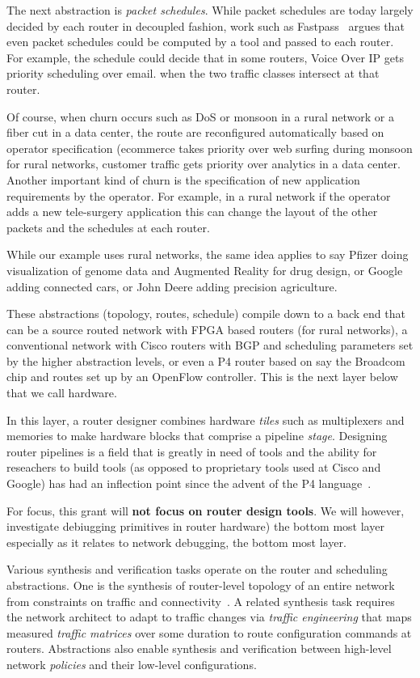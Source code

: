 The next abstraction is {\em packet schedules}.   While packet schedules are
today largely decided by each router in decoupled fashion, work such as 
Fastpass~\cite{fastpass} argues that even packet schedules could be computed by
a tool and passed to each router.  For example, the schedule could decide that
in some routers, Voice Over IP gets priority scheduling over email. when the two traffic classes intersect at that router.

Of course, when churn occurs such as DoS or monsoon in a rural network or a fiber cut in a data center, the route are reconfigured automatically based on operator specification (ecommerce takes priority over web surfing during monsoon for rural
networks, customer traffic gets priority over analytics in a data center.  Another important kind of churn is the specification of new application requirements by the operator.  For example, in a rural network if the operator adds a new tele-surgery application this can change the layout of the other packets and the schedules at 
each router.

While our example uses rural networks, the same idea applies to say Pfizer doing visualization of genome data and Augmented Reality for drug design, or Google adding connected cars, or John Deere adding precision agriculture.

These abstractions (topology, routes, schedule) compile down to a back end
that can be a source routed network with FPGA based routers (for rural 
networks), a  conventional network with Cisco routers with BGP and scheduling parameters set by the higher abstraction levels, or even a P4 router based on say the Broadcom chip and routes set up by an OpenFlow controller.  This is the
next layer below that we call hardware.

In this layer, a router
designer combines hardware {\em tiles} such as multiplexers and
memories to make hardware blocks that comprise a pipeline {\em stage}.
Designing router pipelines is a field that is greatly in need of tools and
the ability for reseachers to build tools (as opposed to proprietary tools used
at Cisco and Google) has had an inflection point since the advent of the
P4 language~\cite{P42016}.  

For focus, this grant will {\bf not focus on router design tools}.  We will however,
investigate debiugging primitives in router hardware) the bottom most layer 
especially as it relates to network debugging, the bottom most layer.


Various synthesis and verification tasks operate on the
router and scheduling abstractions. One is the synthesis of router-level
topology of an entire network from constraints on traffic and
connectivity~\cite{condor}. A related synthesis task requires the
network architect to adapt to traffic changes via {\em traffic
  engineering} that maps measured {\em traffic matrices} over some
duration to route configuration commands at routers.  Abstractions
also enable synthesis and verification between high-level network
\emph{policies} and their low-level configurations.

